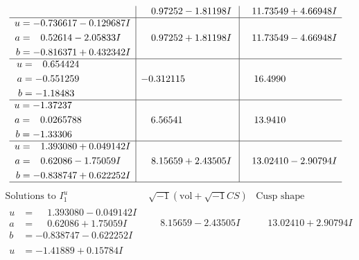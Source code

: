 \documentclass[1p]{elsarticle_modified}
\theoremstyle{definition}
\newcommand{\I}{\sqrt{-1}}
\begin{document}
$$\begin{array}{c|c|c}
 & \phantom{-}0.97252 - 1.81198 I & \phantom{-}11.73549 + 4.66948 I \\ \hline\begin{aligned}
u &= -0.736617 - 0.129687 I \\
a &= \phantom{-}0.52614 - 2.05833 I \\
b &= -0.816371 + 0.432342 I\end{aligned}
 & \phantom{-}0.97252 + 1.81198 I & \phantom{-}11.73549 - 4.66948 I \\ \hline\begin{aligned}
u &= \phantom{-}0.654424\phantom{ +0.000000I} \\
a &= -0.551259\phantom{ +0.000000I} \\
b &= -1.18483\phantom{ +0.000000I}\end{aligned}
 & -0.312115\phantom{ +0.000000I} & \phantom{-}16.4990\phantom{ +0.000000I} \\ \hline\begin{aligned}
u &= -1.37237\phantom{ +0.000000I} \\
a &= \phantom{-}0.0265788\phantom{ +0.000000I} \\
b &= -1.33306\phantom{ +0.000000I}\end{aligned}
 & \phantom{-}6.56541\phantom{ +0.000000I} & \phantom{-}13.9410\phantom{ +0.000000I} \\ \hline\begin{aligned}
u &= \phantom{-}1.393080 + 0.049142 I \\
a &= \phantom{-}0.62086 - 1.75059 I \\
b &= -0.838747 + 0.622252 I\end{aligned}
 & \phantom{-}8.15659 + 2.43505 I & \phantom{-}13.02410 - 2.90794 I\\
 \hline 
 \end{array}$$\newpage$$\begin{array}{c|c|c}  
\text{Solutions to }I^u_{1}& \I (\text{vol} + \sqrt{-1}CS) & \text{Cusp shape}\\
 \hline 
\begin{aligned}
u &= \phantom{-}1.393080 - 0.049142 I \\
a &= \phantom{-}0.62086 + 1.75059 I \\
b &= -0.838747 - 0.622252 I\end{aligned}
 & \phantom{-}8.15659 - 2.43505 I & \phantom{-}13.02410 + 2.90794 I \\ \hline\begin{aligned}
u &= -1.41889 + 0.15784 I \\

\end{aligned}
\end{array}$$
\end{document}
